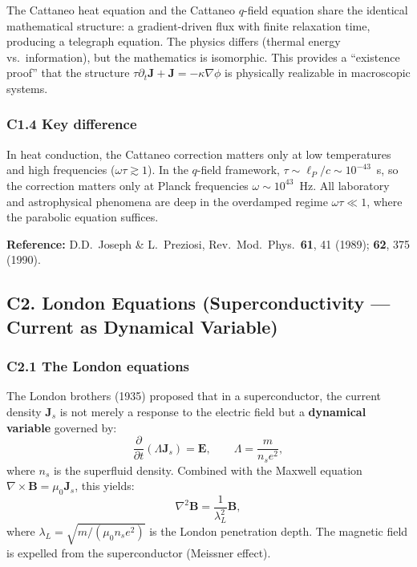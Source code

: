 \documentclass[reprint]{revtex4-2}
\begin{document}
The Cattaneo heat equation and the Cattaneo $q$-field equation share the identical mathematical structure: a gradient-driven flux with finite relaxation time, producing a telegraph equation. The physics differs (thermal energy vs.\ information), but the mathematics is isomorphic. This provides a ``existence proof'' that the structure $\tau\partial_t\mathbf{J} + \mathbf{J} = -\kappa\nabla\phi$ is physically realizable in macroscopic systems.

\subsubsection{C1.4 Key difference}

In heat conduction, the Cattaneo correction matters only at low temperatures and high frequencies ($\omega\tau \gtrsim 1$). In the $q$-field framework, $\tau \sim \ell_P/c \sim 10^{-43}$~s, so the correction matters only at Planck frequencies $\omega \sim 10^{43}$~Hz. All laboratory and astrophysical phenomena are deep in the overdamped regime $\omega\tau \ll 1$, where the parabolic equation suffices.

\textbf{Reference:} D.D.\ Joseph \& L.\ Preziosi, Rev.\ Mod.\ Phys.\ \textbf{61}, 41 (1989); \textbf{62}, 375 (1990).

\subsection{C2. London Equations (Superconductivity --- Current as Dynamical Variable)}

\subsubsection{C2.1 The London equations}

The London brothers (1935) proposed that in a superconductor, the current density $\mathbf{J}_s$ is not merely a response to the electric field but a \textbf{dynamical variable} governed by:
\begin{equation}
\frac{\partial}{\partial t}(\Lambda\mathbf{J}_s) = \mathbf{E}, \qquad \Lambda = \frac{m}{n_s e^2},
\end{equation}
where $n_s$ is the superfluid density. Combined with the Maxwell equation $\nabla\times\mathbf{B} = \mu_0\mathbf{J}_s$, this yields:
\begin{equation}
\nabla^2\mathbf{B} = \frac{1}{\lambda_L^2}\mathbf{B},
\end{equation}
where $\lambda_L = \sqrt{m/(\mu_0 n_s e^2)}$ is the London penetration depth. The magnetic field is expelled from the superconductor (Meissner effect).
\end{document}
